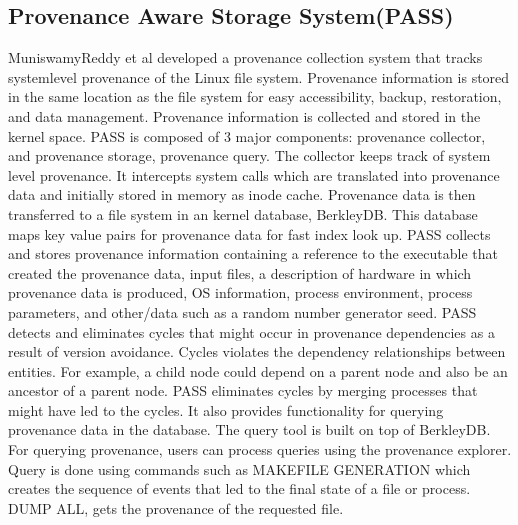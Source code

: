 \subsection{Provenance Aware Storage System(PASS)}
MuniswamyReddy
et al \cite{muniswamy_reddy} developed a provenance collection system that tracks  system\-level provenance of the Linux file system. Provenance information
is stored in the same location as the file system for easy accessibility, backup,
restoration, and data management. Provenance information is collected and stored in
the kernel space. PASS is composed of 3 major components: provenance collector, and provenance storage, provenance query. The collector keeps track of system level provenance. It intercepts system calls which are translated into provenance data and initially stored in memory as inode cache. Provenance data is then transferred to a file system in an kernel database, BerkleyDB. This database maps key value pairs for provenance data for fast index look up. PASS collects and stores provenance information containing a reference to the executable that created the provenance data, input files, a description of hardware in which provenance data is produced, OS information, process environment, process parameters, and other/data such as a random number generator seed. PASS detects and eliminates cycles that might occur in provenance dependencies as a result of version avoidance. Cycles violates the dependency relationships between entities. For example, a child node could depend on a parent node and also be an ancestor of a parent node. PASS eliminates cycles by merging processes that might have led to the cycles. It also provides functionality for querying provenance data in the database. The query tool is built on top of BerkleyDB. For querying provenance, users can process queries using the provenance explorer. Query is done using commands such as MAKEFILE  GENERATION which creates the sequence of events that led to the final state of a file or process. DUMP ALL, gets the provenance of the requested file. 


